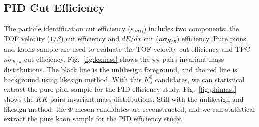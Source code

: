 \subsection{PID Cut Efficiency}
\label{pideff}
The particle identification cut efficiency ($\varepsilon_{PID}$) includes two components: the TOF velocity ($1/\beta$) cut efficiency and $dE/dx$ cut ($n\sigma_{K/\pi}$) efficiency. Pure pions and kaons sample are used to evaluate the TOF velocity cut efficiency and TPC $n\sigma_{K/\pi}$ cut efficiency. Fig.~\ref{fig:ksmass} shows the $\pi\pi$ pairs invariant mass distributions. The black line is the unlikesign foreground, and the red line is background using likesign method. With this $K_{s}^{0}$ candidates, we can statistical extract the pure pion sample for the PID efficiency study. Fig.~\ref{fig:phimass} shows the $KK$ pairs invariant mass distributions. Still with the unlikesign and likesign method, the $\Phi$ meson candidates are reconstructed, and we can statistical extract the pure kaon sample for the PID efficiency study.

